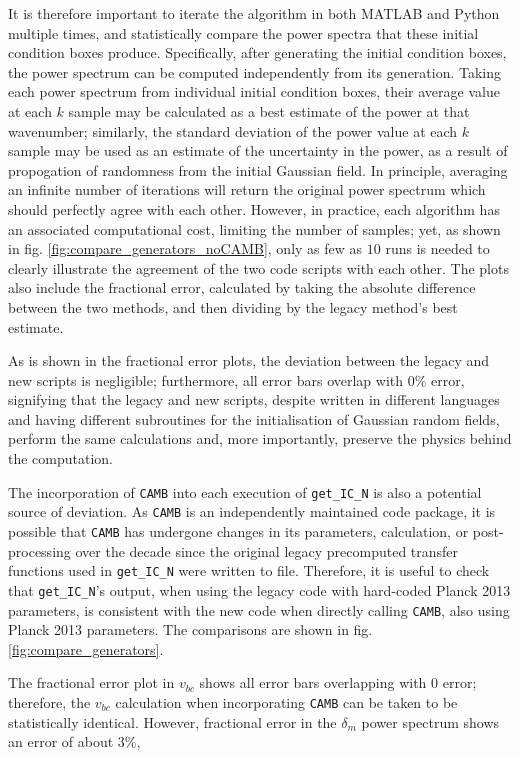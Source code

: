\documentclass[floats,floatfix,showpacs,amssymb,prd,superscriptaddress,nofootinbib]{revtex4-2} %
\newcommand{\code}{\texttt}
\begin{document}
It is therefore important to iterate the algorithm in both MATLAB and Python multiple times, and statistically compare the power spectra that these initial condition boxes produce. Specifically, after generating the initial condition boxes, the power spectrum can be computed independently from its generation. Taking each power spectrum from individual initial condition boxes, their average value at each $k$ sample may be calculated as a best estimate of the power at that wavenumber; similarly, the standard deviation of the power value at each $k$ sample may be used as an estimate of the uncertainty in the power, as a result of propogation of randomness from the initial Gaussian field. In principle, averaging an infinite number of iterations will return the original power spectrum which should perfectly agree with each other. However, in practice, each algorithm has an associated computational cost, limiting the number of samples; yet, as shown in fig. \ref{fig:compare_generators_noCAMB}, only as few as $10$ runs is needed to clearly illustrate the agreement of the two code scripts with each other. The plots also include the fractional error, calculated by taking the absolute difference between the two methods, and then dividing by the legacy method's best estimate.

As is shown in the fractional error plots, the deviation between the legacy and new scripts is negligible; furthermore, all error bars overlap with $0 \%$ error, signifying that the legacy and new scripts, despite written in different languages and having different subroutines for the initialisation of Gaussian random fields, perform the same calculations and, more importantly, preserve the physics behind the computation.

The incorporation of \code{CAMB} into each execution of \code{get\_IC\_N} is also a potential source of deviation. As \code{CAMB} is an independently maintained code package, it is possible that \code{CAMB} has undergone changes in its parameters, calculation, or post-processing over the decade since the original legacy precomputed transfer functions used in \code{get\_IC\_N} were written to file. Therefore, it is useful to check that \code{get\_IC\_N}'s output, when using the legacy code with hard-coded Planck 2013 parameters, is consistent with the new code when directly calling \code{CAMB}, also using Planck 2013 parameters. The comparisons are shown in fig. \ref{fig:compare_generators}.

The fractional error plot in $v_{bc}$ shows all error bars overlapping with $0$ error; therefore, the $v_{bc}$ calculation when incorporating \code{CAMB} can be taken to be statistically identical. However, fractional error in the $\delta_m$ power spectrum shows an error of about $3 \%$, 
\end{document}
